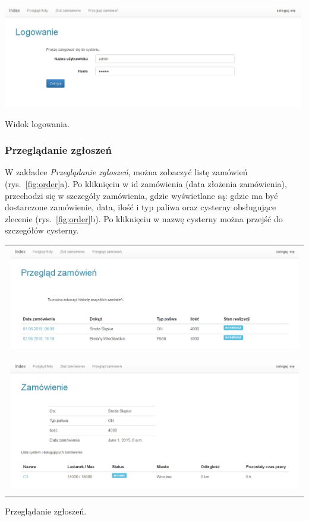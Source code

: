 \documentclass[11pt,a4paper,oneside]{mwart}
\begin{document}
\begin{wykres}[htbp]
  \centering
  \includegraphics[width=0.99\textwidth]{pics/login.png}
  \caption{Widok logowania.}
  \label{fig:login}
\end{wykres}


\subsubsection{Przeglądanie zgłoszeń}
W zakładce \emph{Przeglądanie zgłoszeń}, można zobaczyć listę zamówień (rys.~\ref{fig:order}a). Po kliknięciu w id zamówienia (data złożenia zamówienia), przechodzi się w szczegóły zamówienia, gdzie wyświetlane są: gdzie ma być dostarczone zamówienie, data, ilość i typ paliwa oraz cysterny obsługujące zlecenie (rys.~\ref{fig:order}b). Po kliknięciu w nazwę cysterny można przejść do szczegółów cysterny.
\begin{wykres}[htbp]
  \centering
  \begin{tabular}{c}
    \includegraphics[width=0.99\textwidth]{pics/order_list.png} \\
    \raisebox{1.5ex}{a) Przeglądanie zamówień.} \\
    \\
    \includegraphics[width=0.99\textwidth]{pics/order_detail.png} \\
  \raisebox{1.5ex}{b) Szczegóły zamówienia.}\\ 
\end{tabular}
  \caption{Przeglądanie zgłoszeń.}
  \label{fig:order}
\end{wykres}
\end{document}
